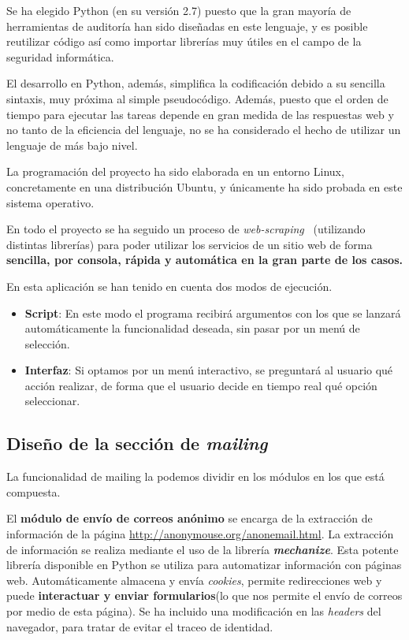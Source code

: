 Se ha elegido Python (en su versión 2.7) puesto que la gran mayoría de herramientas de auditoría han sido diseñadas en este lenguaje, y es posible reutilizar código así como importar librerías muy útiles en el campo de la seguridad informática.

El desarrollo en Python, además, simplifica la codificación debido a su sencilla sintaxis, muy próxima al simple pseudocódigo. Además, puesto que el orden de tiempo para ejecutar las tareas depende en gran medida de las respuestas web y no tanto de la eficiencia del lenguaje, no se ha considerado el hecho de utilizar un lenguaje de más bajo nivel.

La programación del proyecto ha sido elaborada en un entorno Linux, concretamente en una distribución Ubuntu, y únicamente ha sido probada en este sistema operativo.

En todo el proyecto se ha seguido un proceso de \textit{web-scraping}~\cite{article:webscraping} (utilizando distintas librerías) para poder utilizar los servicios de un sitio web de forma \textbf{sencilla, por consola, rápida y automática en la gran parte de los casos.}

En esta aplicación se han tenido en cuenta dos modos de ejecución. 

\begin{itemize}
	\item \textbf{Script}: En este modo el programa recibirá argumentos con los que se lanzará automáticamente la funcionalidad deseada, sin pasar por un menú de selección.
	\item \textbf{Interfaz}: Si optamos por un menú interactivo, se preguntará al usuario qué acción realizar, de forma que el usuario decide en tiempo real qué opción seleccionar.
\end{itemize}

\subsection{Diseño de la sección de \textit{mailing}}

La funcionalidad de mailing la podemos dividir en los módulos en los que está compuesta. 

El \textbf{módulo de envío de correos anónimo} se encarga de la extracción de información de la página \url{http://anonymouse.org/anonemail.html}. La extracción de información se realiza mediante el uso de la librería \textbf{\textit{mechanize}}. Esta potente librería disponible en Python se utiliza para automatizar información con páginas web. Automáticamente almacena y envía \textit{cookies}, permite redirecciones web y puede \textbf{interactuar y enviar formularios}(lo que nos permite el envío de correos por medio de esta página).
Se ha incluido una modificación en las \textit{headers} del navegador, para tratar de evitar el traceo de identidad.

